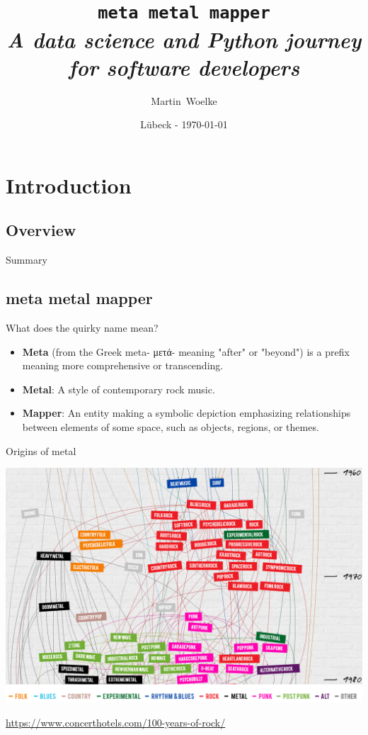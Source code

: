\documentclass{beamer}
\title[Titel]
{
  \texttt{\huge{meta metal mapper}}\\\vspace{3 mm}
  \textit{A data science and Python journey for software developers}
}
\author[Martin Woelke]
{
  Martin~Woelke
}
\date{Lübeck - \today}
\begin{document}
\begin{frame}
  \titlepage
\end{frame}


\section{Introduction}


  \subsection{Overview}

    \begin{frame}{Summary}
      \tableofcontents
    \end{frame}

  \subsection{meta metal mapper}

	  \begin{frame}{What does the quirky name mean?}
	    \begin{itemize}
        \item<1->\textbf{Meta} (from the Greek meta- \foreignlanguage{greek}{μετά}- meaning
        "after" or "beyond") is a prefix meaning more comprehensive or transcending.
        \item<2->\textbf{Metal}: A style of contemporary rock  music.
        \item<3->\textbf{Mapper}: An entity making a symbolic depiction emphasizing relationships
        between elements of some space, such as objects, regions, or themes.
      \end{itemize}
    \end{frame}	  
	
    \begin{frame}{Origins of metal}
      \begin{center}
        \includegraphics[scale=.33]{familyTree2}
      \end{center}
      \href{https://www.concerthotels.com/100-years-of-rock/}{https://www.concerthotels.com/100-years-of-rock/}
    \end{frame}
\end{document}
